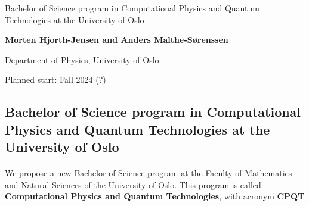 \documentclass[%
oneside,                 %
final,                   %
10pt]{article}
\begin{document}

\newcommand{\exercisesection}[1]{\subsection*{#1}}






\thispagestyle{empty}

\begin{center}
{\LARGE\bf
\begin{spacing}{1.25}
Bachelor of Science program in Computational Physics and Quantum Technologies  at the University of Oslo
\end{spacing}
}
\end{center}


\begin{center}
{\bf Morten Hjorth-Jensen and Anders Malthe-Sørenssen}
\end{center}

    \begin{center}
\centerline{{\small Department of Physics, University of Oslo}}
\end{center}
    


\begin{center}
Planned start: Fall 2024 (?)
\end{center}

\vspace{1cm}


\subsection{Bachelor of Science program in Computational Physics and Quantum Technologies  at the University of Oslo}

\paragraph{}
We propose a new Bachelor of Science program at the Faculty of Mathematics and Natural Sciences of the University of Oslo. This program is called  \textbf{Computational Physics and Quantum Technologies}, with acronym  \textbf{CPQT}
\end{document}
